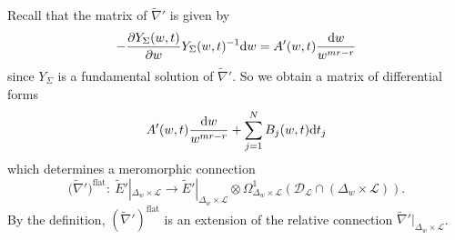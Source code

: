 \documentclass[pdftex]{sigma}
\numberwithin{equation}{section}
\begin{document}
Recall that the matrix of $\tilde{\nabla}'$ is given by
\[
 -\frac {\partial Y_{\Sigma}(w,t)} {\partial w} Y_{\Sigma}(w,t)^{-1} {\rm d}w
 =
 A'(w,t)\frac{{\rm d}w}{w^{mr-r}}
\]
since $Y_{\Sigma}$ is a fundamental solution of $\tilde{\nabla}'$.
So we obtain a matrix of differential forms
\[
 A'(w,t)\frac{{\rm d}w}{w^{mr-r}}
 +\sum_{j=1}^N B_j(w,t){\rm d}t_j
\]
which determines a meromorphic connection
\begin{equation*}
 \big(\tilde{\nabla}'\big)^{\mathrm{flat}}
 \colon \
 \tilde{E}'|_{\Delta_w\times {\mathcal L}} \longrightarrow
 \tilde{E}'|_{\Delta_w\times{\mathcal L}} \otimes
 \Omega^1_{\Delta_w\times{\mathcal L}}
 ({\mathcal D}_{\mathcal L}\cap(\Delta_w\times{\mathcal L})).
\end{equation*}
By the definition, $(\tilde{\nabla}')^{\mathrm{flat}}$
is an extension of the relative connection
$\tilde{\nabla}'|_{\Delta_w\times{\mathcal L}}$.
\end{document}
